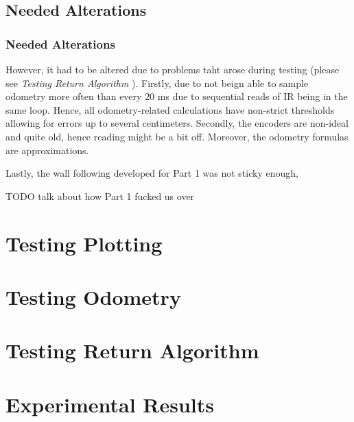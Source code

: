 \documentclass[11pt, a4paper]{article}
\begin{document}
\subsection{Needed Alterations}

\subsubsection{Needed Alterations}
However, it had to be altered due to problems taht arose during testing (please see 
\textit{Testing Return Algorithm} ). Firstly, due to not beign able to sample odometry more often than 
every $20$ ms\cite{khepera_manual} due to sequential reads of IR being in the same loop. Hence,
all odometry-related calculations have non-strict thresholds allowing for errors up to several 
centimeters. Secondly, the encoders are non-ideal and quite old, hence reading might be a bit off.
Moreover, the odometry formulas are approximations. 



Lastly, the wall following developed for Part 1
was not sticky enough,

TODO talk about how Part 1 fucked us over



\section{Testing Plotting}
\label{Testing Plotting}




\section{Testing Odometry}
\label{Testing Odometry}





\section{Testing Return Algorithm}
\label{Testing Return Algorithm}




\section{Experimental Results}
\label{Results}
\end{document}
